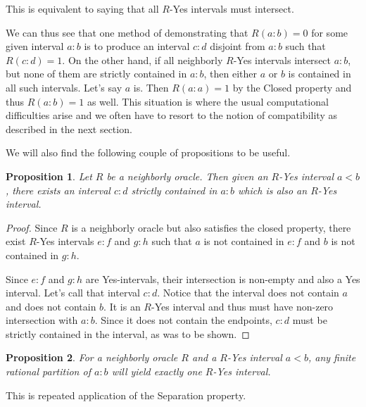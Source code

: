 \documentclass[12pt]{article}
\newtheorem{proposition}{Proposition}[subsection]
\theoremstyle{remark}
\begin{document}
This is equivalent to saying that all $R$-Yes intervals must intersect. 

We can thus see that one method of demonstrating that $R(a:b)=0$ for some given interval $a:b$ is to produce an interval $c:d$ disjoint from $a:b$ such that $R(c:d)=1$. On the other hand, if all neighborly $R$-Yes intervals intersect $a:b$, but none of them are strictly contained in $a:b$, then either $a$ or $b$ is contained in all such intervals. Let's say $a$ is. Then $R(a:a)=1$ by the Closed property and thus $R(a:b)=1$ as well. This situation is where the usual computational difficulties arise and we often have to resort to the notion of compatibility as described in the next section. 

We will also find the following couple of propositions to be useful. 

\begin{proposition}\label{pr:subinter}
Let $R$ be a neighborly oracle. Then given an $R$-Yes interval $a\lt b$, there exists an interval $c:d$ strictly contained in $a:b$ which is also an $R$-Yes interval. 
\end{proposition}

\begin{proof}
Since $R$ is a neighborly oracle but also satisfies the closed property, there exist $R$-Yes intervals $e:f$ and $g:h$ such that $a$ is not contained in $e:f$ and $b$ is not contained in $g:h$. 

Since $e:f$ and $g:h$ are Yes-intervals, their intersection is non-empty and also a Yes interval. Let's call that interval $c:d$.  Notice that the interval does not contain $a$ and does not contain $b$. It is an $R$-Yes interval and thus must have non-zero intersection with $a:b$. Since it does not contain the endpoints, $c:d$ must be strictly contained in the interval, as was to be shown. 
\end{proof}

\begin{proposition}\label{pr:multi}
For a neighborly oracle $R$ and a $R$-Yes interval $a\lt b$, any finite rational partition of $a:b$ will yield exactly one $R$-Yes interval. 
\end{proposition}

This is repeated application of the Separation property. 
\end{document}
